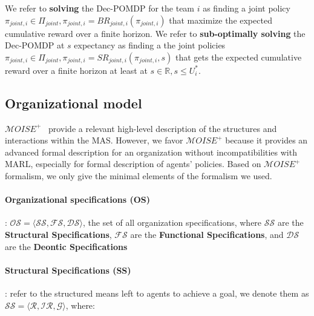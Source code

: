 \documentclass{ecai}
\begin{document}
We refer to \textbf{solving} the Dec-POMDP for the team $i$ as finding a joint policy $\pi_{joint,i} \in \Pi_{joint}, \pi_{joint,i} = BR_{joint,i}(\pi_{joint,i})$ that maximize the expected cumulative reward over a finite horizon.
We refer to \textbf{sub-optimally solving} the Dec-POMDP at $s$ expectancy as finding a the joint policies $\pi_{joint,i} \in \Pi_{joint}, \pi_{joint,i} = SR_{joint,i}(\pi_{joint,i}, s)$ that gets the expected cumulative reward over a finite horizon at least at $s \in \mathbb{R}, s \leq U_i^*$.


\subsection{Organizational model}

$\mathcal{M}OISE^+$~\citep{Hubner2002} provide a relevant high-level description of the structures and interactions within the MAS. However, we favor $\mathcal{M}OISE^+$ because it provides an advanced formal description for an organization without incompatibilities with MARL, especially for formal description of agents' policies.
Based on $\mathcal{M}OISE^+$~\citep{Hubner2007} formalism, we only give the minimal elements of the formalism we used.

\paragraph{\textbf{Organizational specifications (OS)}}: $\mathcal{OS} = \langle \mathcal{SS}, \mathcal{FS}, \mathcal{DS} \rangle$, the set of all organization specifications, where $\mathcal{SS}$ are the \textbf{Structural Specifications}, $\mathcal{FS}$ are the \textbf{Functional Specifications}, and $\mathcal{DS}$ are the \textbf{Deontic Specifications}

\paragraph{\textbf{Structural Specifications (SS)}}: refer to the structured means left to agents to achieve a goal, we denote them as $\mathcal{SS} = \langle \mathcal{R}, \mathcal{IR}, \mathcal{G} \rangle$, where:
\end{document}
